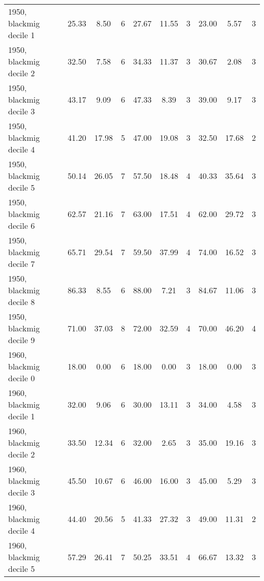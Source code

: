 \begin{table}[htbp]
\begin{tabular}{l*{3}{ccc}}
1950, blackmig decile 1&       25.33&        8.50&           6&       27.67&       11.55&           3&       23.00&        5.57&           3\\
1950, blackmig decile 2&       32.50&        7.58&           6&       34.33&       11.37&           3&       30.67&        2.08&           3\\
1950, blackmig decile 3&       43.17&        9.09&           6&       47.33&        8.39&           3&       39.00&        9.17&           3\\
1950, blackmig decile 4&       41.20&       17.98&           5&       47.00&       19.08&           3&       32.50&       17.68&           2\\
1950, blackmig decile 5&       50.14&       26.05&           7&       57.50&       18.48&           4&       40.33&       35.64&           3\\
1950, blackmig decile 6&       62.57&       21.16&           7&       63.00&       17.51&           4&       62.00&       29.72&           3\\
1950, blackmig decile 7&       65.71&       29.54&           7&       59.50&       37.99&           4&       74.00&       16.52&           3\\
1950, blackmig decile 8&       86.33&        8.55&           6&       88.00&        7.21&           3&       84.67&       11.06&           3\\
1950, blackmig decile 9&       71.00&       37.03&           8&       72.00&       32.59&           4&       70.00&       46.20&           4\\
1960, blackmig decile 0&       18.00&        0.00&           6&       18.00&        0.00&           3&       18.00&        0.00&           3\\
1960, blackmig decile 1&       32.00&        9.06&           6&       30.00&       13.11&           3&       34.00&        4.58&           3\\
1960, blackmig decile 2&       33.50&       12.34&           6&       32.00&        2.65&           3&       35.00&       19.16&           3\\
1960, blackmig decile 3&       45.50&       10.67&           6&       46.00&       16.00&           3&       45.00&        5.29&           3\\
1960, blackmig decile 4&       44.40&       20.56&           5&       41.33&       27.32&           3&       49.00&       11.31&           2\\
1960, blackmig decile 5&       57.29&       26.41&           7&       50.25&       33.51&           4&       66.67&       13.32&           3\\

\end{tabular}
\end{table}
